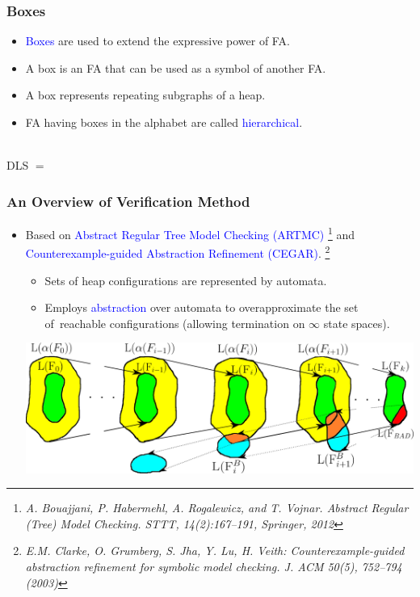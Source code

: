 \documentclass{beamer}
\newcommand{\hlbl}[1]{\textcolor{blue}{#1}}
\begin{document}
 
\begin{frame}
\frametitle{Boxes}

\begin{itemize}
		\item \hlbl{Boxes} are used to extend the expressive power of FA.
		\item A box is an FA that can be used as a symbol of another FA.
		\item A box represents repeating subgraphs of a heap.
		\item FA having boxes in the alphabet are called \hlbl{hierarchical}.
	\end{itemize}
		\vspace{-0.8cm}
		\centering \\
		\vspace{0.7cm}
		\centering DLS $=$ \\
		\vspace{-0.8cm}
		\centering 
\end{frame}


\begin{frame}
  \frametitle{An Overview of Verification Method}
   \begin{itemize}
	   \item Based on \hlbl{Abstract Regular Tree Model Checking (ARTMC)}
		   \footnote{\tiny{\textit{A. Bouajjani, P. Habermehl, A. Rogalewicz, and T. Vojnar. Abstract Regular (Tree) Model Checking. STTT, 14(2):167--191, Springer, 2012}}}
		   and \hlbl{Counterexample-guided Abstraction Refinement (CEGAR)}.
			\footnote{\tiny{\textit{E.M. Clarke, O. Grumberg, S. Jha, Y. Lu, H. Veith: Counterexample-guided abstraction refinement for symbolic model checking. J. ACM 50(5), 752–794 (2003)}}}
		\begin{itemize}
			\item Sets of heap configurations are represented by automata.
			\item Employs \hlbl{abstraction} over automata to overapproximate the set of~reachable configurations (allowing termination on $\infty$ state spaces).
		\end{itemize}
	   \pause
	   \vspace{0.2cm}
	   \includegraphics[scale=0.26]{artmc.png}
  \end{itemize}
\end{frame}
 
\end{document}
